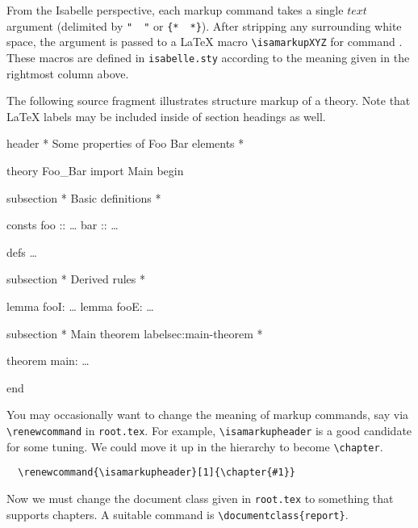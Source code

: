 \begin{isabellebody}
\begin{isamarkuptext}
  From the Isabelle perspective, each markup command takes a single
  $text$ argument (delimited by \verb,",~\isa{{\isasymdots}}~\verb,", or
  \verb,{,\verb,*,~\isa{{\isasymdots}}~\verb,*,\verb,},).  After stripping any
  surrounding white space, the argument is passed to a {\LaTeX} macro
  \verb,\isamarkupXYZ, for command .  These macros are
  defined in \verb,isabelle.sty, according to the meaning given in the
  rightmost column above.

  \medskip The following source fragment illustrates structure markup
  of a theory.  Note that {\LaTeX} labels may be included inside of
  section headings as well.

  \begin{ttbox}
  header {\ttlbrace}* Some properties of Foo Bar elements *{\ttrbrace}

  theory Foo_Bar
  import Main
  begin

  subsection {\ttlbrace}* Basic definitions *{\ttrbrace}

  consts
    foo :: \dots
    bar :: \dots

  defs \dots

  subsection {\ttlbrace}* Derived rules *{\ttrbrace}

  lemma fooI: \dots
  lemma fooE: \dots

  subsection {\ttlbrace}* Main theorem {\ttback}label{\ttlbrace}sec:main-theorem{\ttrbrace} *{\ttrbrace}

  theorem main: \dots

  end
  \end{ttbox}\vspace{-\medskipamount}

  You may occasionally want to change the meaning of markup commands,
  say via \verb,\renewcommand, in \texttt{root.tex}.  For example,
  \verb,\isamarkupheader, is a good candidate for some tuning.  We
  could move it up in the hierarchy to become \verb,\chapter,.

\begin{verbatim}
  \renewcommand{\isamarkupheader}[1]{\chapter{#1}}
\end{verbatim}

  \noindent Now we must change the document class given in
  \texttt{root.tex} to something that supports chapters.  A suitable
  command is \verb,\documentclass{report},.


\end{isamarkuptext}
\end{isabellebody}
